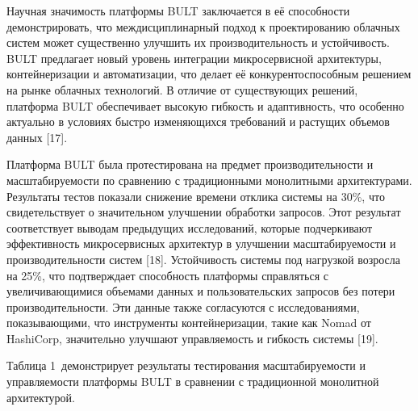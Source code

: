 \begin{multicols}{2}
Научная значимость платформы BULT заключается в её способности
демонстрировать, что междисциплинарный подход к проектированию облачных
систем может существенно улучшить их производительность и устойчивость.
BULT предлагает новый уровень интеграции микросервисной архитектуры,
контейнеризации и автоматизации, что делает её конкурентоспособным
решением на рынке облачных технологий. В отличие от существующих
решений, платформа BULT обеспечивает высокую гибкость и адаптивность,
что особенно актуально в условиях быстро изменяющихся требований и
растущих объемов данных {[}17{]}.

Платформа BULT была протестирована на предмет производительности и
масштабируемости по сравнению с традиционными монолитными архитектурами.
Результаты тестов показали снижение времени отклика системы на 30\%, что
свидетельствует о значительном улучшении обработки запросов. Этот
результат соответствует выводам предыдущих исследований, которые
подчеркивают эффективность микросервисных архитектур в улучшении
масштабируемости и производительности систем {[}18{]}. Устойчивость
системы под нагрузкой возросла на 25\%, что подтверждает способность
платформы справляться с увеличивающимися объемами данных и
пользовательских запросов без потери производительности. Эти данные
также согласуются с исследованиями, показывающими, что инструменты
контейнеризации, такие как Nomad от HashiCorp, значительно улучшают
управляемость и гибкость системы {[}19{]}.

Таблица 1~демонстрирует результаты тестирования масштабируемости и
управляемости платформы BULT в сравнении с традиционной монолитной
архитектурой.
\end{multicols}

